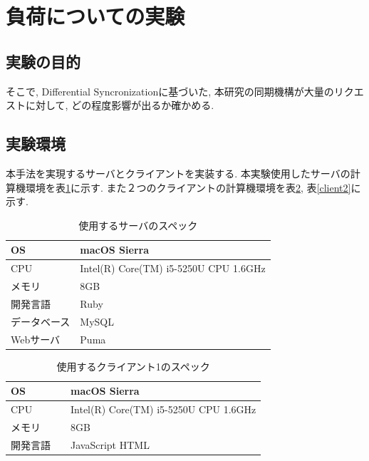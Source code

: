 \section{負荷についての実験}
\subsection{実験の目的}
そこで, Differential Syncronizationに基づいた, 本研究の同期機構が大量のリクエストに対して, どの程度影響が出るか確かめる.
\subsection{実験環境}
本手法を実現するサーバとクライアントを実装する. 本実験使用したサーバの計算機環境を表\ref{server}に示す. また２つのクライアントの計算機環境を表\ref{client1}, 表\ref{client2}に示す.
\begin{table}[htbp]
\begin{center}
	\caption{使用するサーバのスペック}
	\begin{tabular}{|l|l|} \hline
		OS &  macOS Sierra　\\ \hline
		CPU & Intel(R) Core(TM) i5-5250U CPU 1.6GHz \\ \hline
		メモリ & 8GB \\ \hline
    開発言語　& Ruby \\ \hline
		データベース & MySQL \\ \hline
		Webサーバ & Puma\\ \hline
	\end{tabular}
	\label{server}
\end{center}
\end{table}

\begin{table}[htbp]
\begin{center}
	\caption{使用するクライアント1のスペック}
	\begin{tabular}{|l|l|} \hline
		OS & macOS Sierra \\ \hline
		CPU & Intel(R) Core(TM) i5-5250U CPU 1.6GHz \\ \hline
		メモリ & 8GB \\ \hline
    開発言語　& JavaScript HTML \\ \hline
	\end{tabular}
	\label{client1}
\end{center}
\end{table}

